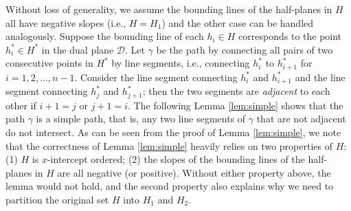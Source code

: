 \documentclass{llncs}
\def\calD{\mathcal{D}}
\begin{document}
Without loss of generality, we assume the
bounding lines of the half-planes in $H$ all have negative slopes
(i.e., $H=H_1$) and the other case can be handled analogously. Suppose
the bounding line of each $h_i\in H$ corresponds to the point $h_i^*\in H^*$
in the dual plane $\calD$. Let $\gamma$ be the path by connecting all
pairs of two consecutive points in $H^*$ by line segments, i.e.,
connecting $h^*_i$ to $h^*_{i+1}$
for $i=1,2,\ldots,n-1$. Consider the line segment connecting $h^*_i$ and
$h^*_{i+1}$ and the line segment connecting $h^*_j$ and $h^*_{j+1}$; then
the two segments are {\em adjacent} to each other if $i+1=j$ or
$j+1=i$. The following Lemma \ref{lem:simple} shows that the path
$\gamma$ is a simple path, that is, any two line segments of $\gamma$
that are not adjacent do not intersect.
As can be seen from the proof of Lemma \ref{lem:simple}, we note that
the correctness of Lemma \ref{lem:simple} heavily relies on two properties of $H$:
(1) $H$ is $x$-intercept ordered; (2) the slopes of the bounding lines
of the half-planes in $H$ are all negative (or positive). Without
either property above, the lemma would not hold, and the second
property also
explains why we need to partition the original set $H$ into $H_1$ and
$H_2$.
\end{document}

